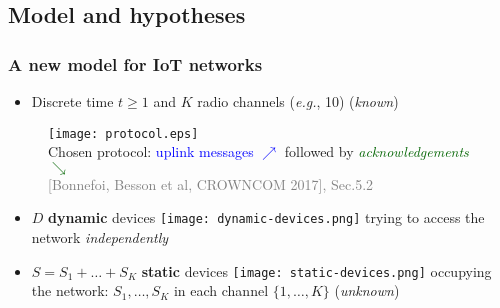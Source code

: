 \subsection{Model and hypotheses}

\subsubsection{A new model for IoT networks}

\begin{frameO}

    \begin{itemize}
        \item
              Discrete time \(t\geq1\) and \(K\) radio channels (\emph{e.g.}, 10)
              \hfill{} (\emph{known})
    \end{itemize}

    \begin{figure}[h!]
        \centering
        \texttt{[image: protocol.eps]}\\
        
        {\small Chosen protocol: \textcolor{blue}{uplink messages {\large $\nearrow$}} followed by \textcolor{darkgreen}{\emph{acknowledgements} {\large $\searrow$}}}\\
        \hfill{} {\tiny \textcolor{gray}{[Bonnefoi, Besson et al, CROWNCOM 2017], Sec.5.2}}
    \end{figure}

    \begin{itemize}
        \item
              \(D\) \textbf{dynamic} devices \texttt{[image: dynamic-devices.png]} trying to access the network \emph{independently}
        \item
              \(S=S_1+\dots+S_{K}\) \textbf{static} devices \texttt{[image: static-devices.png]} occupying the network:
              \newline
              \(S_1,\dots,S_{K}\) in each channel \(\{1,\dots,K\}\) \hfill{} (\emph{unknown})
    \end{itemize}

\end{frameO}


\begin{frameO}

    \begin{center}
    \end{center}

\end{frameO}


